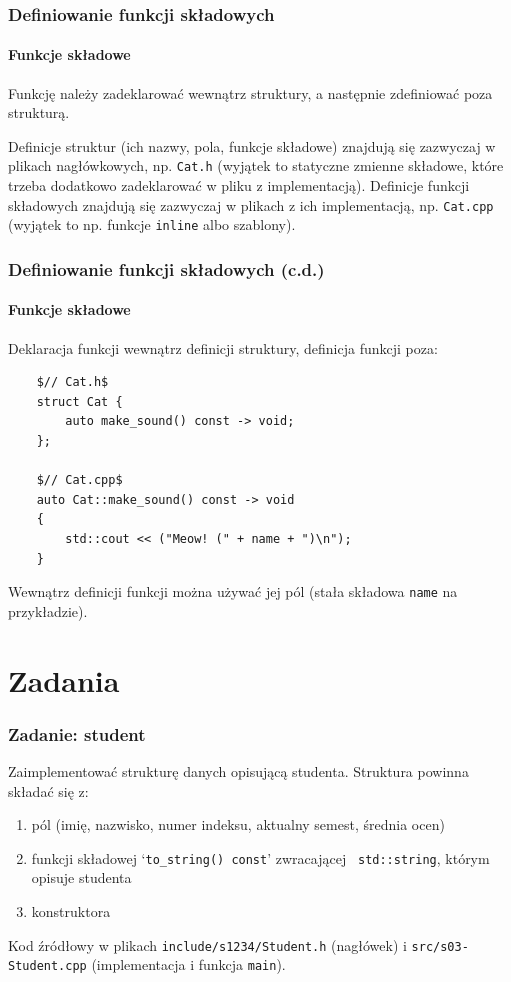 \documentclass[aspectratio=169]{beamer}
\begin{document}
\begin{frame}
    \frametitle{Definiowanie funkcji składowych}
    \framesubtitle{Funkcje składowe}

    Funkcję należy zadeklarować wewnątrz struktury, a następnie zdefiniować poza
    strukturą.

    \vspace{1em}

    Definicje struktur (ich nazwy, pola, funkcje składowe) znajdują się
    zazwyczaj w plikach nagłówkowych, np. {\tt Cat.h} (wyjątek to statyczne
    zmienne składowe, które trzeba dodatkowo zadeklarować w pliku z
    implementacją).\newline
    Definicje funkcji składowych znajdują się zazwyczaj w plikach z ich
    implementacją, np. {\tt Cat.cpp} (wyjątek to np. funkcje {\tt inline} albo
    szablony).
\end{frame}

\begin{frame}[fragile]
    \frametitle{Definiowanie funkcji składowych (c.d.)}
    \framesubtitle{Funkcje składowe}

    Deklaracja funkcji wewnątrz definicji struktury, definicja funkcji poza:

    {\scriptsize
    \begin{lstlisting}
    $// Cat.h$
    struct Cat {
        auto make_sound() const -> void;
    };

    $// Cat.cpp$
    auto Cat::make_sound() const -> void
    {
        std::cout << ("Meow! (" + name + ")\n");
    }
    \end{lstlisting}}

    Wewnątrz definicji funkcji można używać jej pól (stała składowa {\tt name}
    na przykładzie).
\end{frame}

\section{Zadania}

\begin{frame}
    \frametitle{Zadanie: student}
    \label{lecture_exercise_0}

    Zaimplementować strukturę danych opisującą studenta. Struktura powinna
    składać się z:
    \begin{enumerate}
        \item pól (imię, nazwisko, numer indeksu, aktualny semest,
            średnia ocen)
        \item funkcji składowej `{\tt to\_string() const}' zwracającej {\tt
            std::string}, którym opisuje studenta
        \item konstruktora
    \end{enumerate}

    \vspace{1em}

    Kod źródłowy w plikach {\tt include/s1234/Student.h} (nagłówek) i
    {\tt src/s03-Student.cpp} (implementacja i funkcja {\tt main}).
\end{frame}
\end{document}
